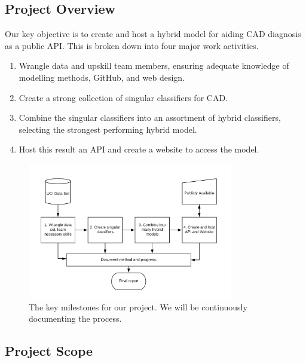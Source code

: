 \documentclass[a4paper, 12pt]{article}
\begin{document}
    \subsection{Project Overview}
    Our key objective is to create and host a hybrid model for aiding CAD diagnosis as a public API. This is broken down into four major work activities.
    \begin{enumerate}
        \item Wrangle data and upskill team members, ensuring adequate knowledge of modelling methods, GitHub, and web design.
        \item Create a strong collection of singular classifiers for CAD.
        \item Combine the singular classifiers into an assortment of hybrid classifiers, selecting the strongest performing hybrid model.
        \item Host this result an API and create a website to access the model.
    \end{enumerate}
    \begin{figure}
        \centering
        \includegraphics[width=0.8\textwidth]{FIT3163 Project Milestones.png}
        \caption{The key milestones for our project. We will be continuously documenting the process.}
        \label{fig:milestones}
    \end{figure}
    \subsection{Project Scope}
\end{document}
